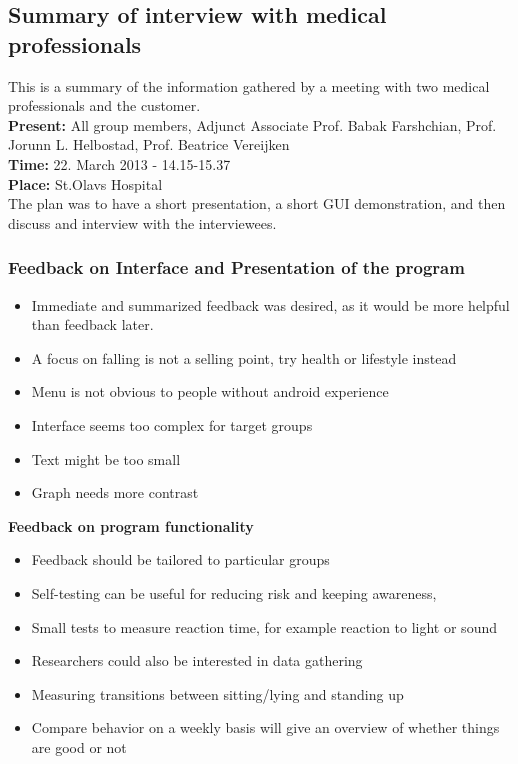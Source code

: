 \subsection{Summary of interview with medical professionals}
This is a summary of the information gathered by a meeting with two medical professionals and the customer.\\
\textbf{Present:} All group members, Adjunct Associate Prof. Babak Farshchian, Prof. Jorunn L. Helbostad, Prof. Beatrice Vereijken \\
\textbf{Time:} 22. March 2013 - 14.15-15.37\\
\textbf{Place:} St.Olavs Hospital\\
The plan was to have a short presentation, a short GUI demonstration, and then discuss and interview with the interviewees. \\
\subsubsection*{Feedback on Interface and Presentation of the program}
\begin{itemize}
\item Immediate and summarized feedback was desired, as it would be more helpful than feedback later.
\item A focus on falling is not a selling point, try health or lifestyle instead
\item Menu is not obvious to people without android experience
\item Interface seems too complex for target groups
\item Text might be too small
\item Graph needs more contrast 

\end{itemize}

\textbf{Feedback on program functionality}
\begin{itemize}
\item Feedback should be tailored to particular groups
\item Self-testing can be useful for reducing risk and keeping awareness,
\item Small tests to measure reaction time, for example reaction to light or sound
\item Researchers could also be interested in data gathering
\item Measuring transitions between sitting/lying and standing up
\item Compare behavior on a weekly basis will give an overview of whether things are good or not
\end{itemize}

